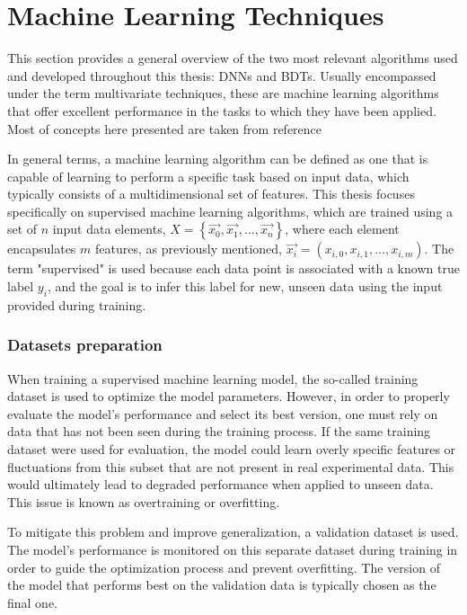 \section{Machine Learning Techniques}
\label{sec:ml_methods}
This section provides a general overview of the two most relevant algorithms used and developed throughout this thesis: DNNs and BDTs. Usually encompassed under the term multivariate techniques, these are machine learning algorithms that offer excellent performance in the tasks to which they have been applied.
Most of concepts here presented are taken from reference~\cite{Goodfellow-et-al-2016}

In general terms, a machine learning algorithm can be defined as one that is capable of learning to perform a specific task based on input data, which typically consists of a multidimensional set of features. This thesis focuses specifically on supervised machine learning algorithms, which are trained using a set of $n$ input data elements, $X = \left\{\vec{x_{0}}, \vec{x_{1}}, ..., \vec{x_{n}} \right\}$, where each element encapsulates $m$ features, as previously mentioned, $\vec{x_{i}}=(x_{i,0}, x_{i,1}, ..., x_{i,m})$. The term "supervised" is used because each data point is associated with a known true label $y_{i}$, and the goal is to infer this label for new, unseen data using the input provided during training.

\subsubsection*{Datasets preparation}
When training a supervised machine learning model, the so-called training dataset is used to optimize the model parameters. However, in order to properly evaluate the model's performance and select its best version, one must rely on data that has not been seen during the training process. If the same training dataset were used for evaluation, the model could learn overly specific features or fluctuations from this subset that are not present in real experimental data. This would ultimately lead to degraded performance when applied to unseen data. This issue is known as overtraining or overfitting.

To mitigate this problem and improve generalization, a validation dataset is used. The model's performance is monitored on this separate dataset during training in order to guide the optimization process and prevent overfitting. The version of the model that performs best on the validation data is typically chosen as the final one.


